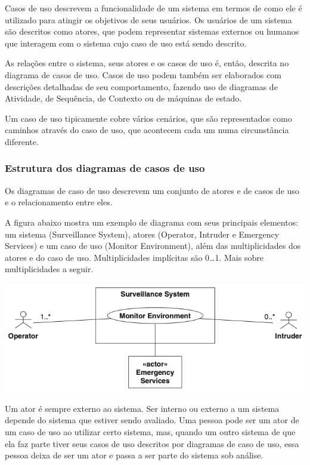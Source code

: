 Casos de uso descrevem a funcionalidade de um sistema em termos de como ele é utilizado para atingir os objetivos de seus usuários. Os usuários de um sistema são descritos como atores, que podem representar sistemas externos ou humanos que interagem com o sistema cujo caso de uso está sendo descrito.

As relações entre o sistema, seus atores e os casos de uso é, então, descrita no diagrama de casos de uso.
Casos de uso podem também ser elaborados com descrições detalhadas de seu comportamento, fazendo uso de diagramas de Atividade, de Sequência, de Contexto ou de máquinas de estado.

Um caso de uso tipicamente cobre vários cenários, que são representados como caminhos através do caso de uso, que acontecem cada um numa circunstância diferente.

\subsubsection{Estrutura dos diagramas de casos de uso}
Os diagramas de caso de uso descrevem um conjunto de atores e de casos de uso e o relacionamento entre eles.

A figura abaixo mostra um exemplo de diagrama com seus principais elementos: um sistema (Surveillance System), atores (Operator, Intruder e Emergency Services) e um caso de uso (Monitor Environment), além das multiplicidades dos atores e do caso de uso. Multiplicidades implícitas são 0…1. Mais sobre multiplicidades a seguir.

\includegraphics[width=\textwidth,height=\textheight,keepaspectratio]{figures/diagrama-caso-de-uso-1.png}

Um ator é sempre externo ao sistema. Ser interno ou externo a um sistema depende do sistema que estiver sendo avaliado. Uma pessoa pode ser um ator de um caso de uso ao utilizar certo sistema, mas, quando um outro sistema de que ela faz parte tiver seus casos de uso descritos por diagramas de caso de uso, essa pessoa deixa de ser um ator e passa a ser parte do sistema sob análise.

